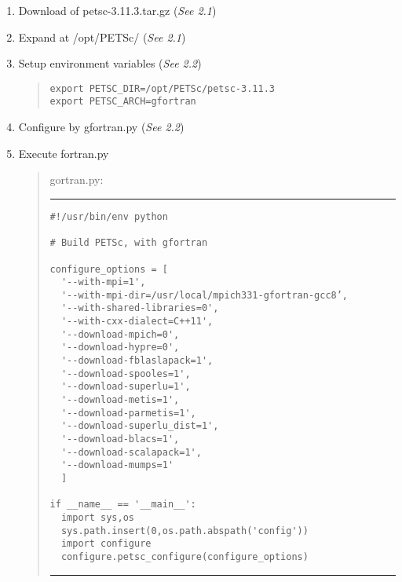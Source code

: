 \documentclass[11pt]{article}
\begin{document}
\begin{enumerate}
\item
Download of petsc-3.11.3.tar.gz \qquad (\textit{See 2.1})
\item
Expand at /opt/PETSc/ \qquad (\textit{See 2.1})
\item
Setup environment variables \qquad (\textit{See 2.2})
\begin{quote}
\begin{verbatim}
export PETSC_DIR=/opt/PETSc/petsc-3.11.3
export PETSC_ARCH=gfortran
\end{verbatim}
\end{quote}
\item
Configure by gfortran.py  \qquad (\textit{See 2.2})
\item
Execute fortran.py

\begin{quote}
gortran.py:
\hrule
\begin{verbatim}
#!/usr/bin/env python

# Build PETSc, with gfortran

configure_options = [
  '--with-mpi=1',
  '--with-mpi-dir=/usr/local/mpich331-gfortran-gcc8’,
  '--with-shared-libraries=0',
  '--with-cxx-dialect=C++11',
  '--download-mpich=0',
  '--download-hypre=0',
  '--download-fblaslapack=1',
  '--download-spooles=1',
  '--download-superlu=1',
  '--download-metis=1',
  '--download-parmetis=1',
  '--download-superlu_dist=1',
  '--download-blacs=1',
  '--download-scalapack=1',
  '--download-mumps=1'
  ]

if __name__ == '__main__':
  import sys,os
  sys.path.insert(0,os.path.abspath('config'))
  import configure
  configure.petsc_configure(configure_options)
\end{verbatim}
\hrule
\end{quote}
\end{enumerate}
\end{document}
